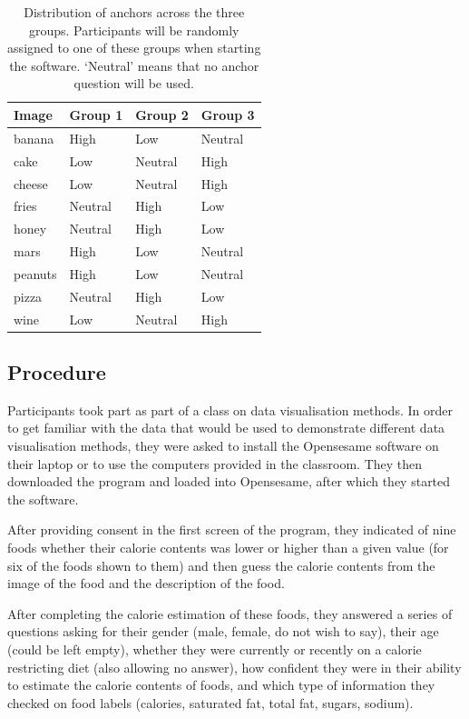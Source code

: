 \documentclass[a4paper,doc,natbib]{apa6}
\begin{document}
    \begin{table}[!h]
        \caption{Distribution of anchors across the three groups. Participants will be randomly assigned to one of these groups when starting the software. `Neutral' means that no anchor question will be used.}
        \label{tab:design}
        \begin{tabular}{p{5cm}p{3cm}p{3cm}p{3cm}}
            \hline
            Image   & Group 1 & Group 2 & Group 3 \\
            \hline
            banana  & High    & Low     & Neutral \\
            cake    & Low     & Neutral & High    \\
            cheese  & Low     & Neutral & High    \\
            fries   & Neutral & High    & Low     \\
            honey   & Neutral & High    & Low     \\
            mars    & High    & Low     & Neutral \\
            peanuts & High    & Low     & Neutral \\
            pizza   & Neutral & High    & Low     \\
            wine    & Low     & Neutral & High    \\
            \hline
        \end{tabular}
    \end{table}

    \subsection{Procedure}

    Participants took part as part of a class on data visualisation methods. In order to get familiar with the data that would be used to demonstrate different data visualisation methods, they were asked to install the Opensesame software \citep{mathot12} on their laptop or to use the computers provided in the classroom. They then downloaded the program and loaded into Opensesame, after which they started the software.

    After providing consent in the first screen of the program, they indicated of nine foods whether their calorie contents was lower or higher than a given value (for six of the foods shown to them) and then guess the calorie contents from the image of the food and the description of the food.

    After completing the calorie estimation of these foods, they answered a series of questions asking for their gender (male, female, do not wish to say), their age (could be left empty), whether they were currently or recently on a calorie restricting diet (also allowing no answer), how confident they were in their ability to estimate the calorie contents of foods, and which type of information they checked on food labels (calories, saturated fat, total fat, sugars, sodium).
\end{document}
